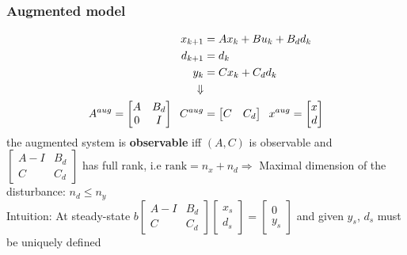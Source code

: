 \subsubsection{Augmented model}
\begin{align*}
    x_{k+1} &= Ax_k + B u_k + B_d d_k\\
    d_{k+1} &= d_k\\
    y_k &= Cx_k + C_dd_k\\ 
    \Downarrow \\
    A^{aug} = \begin{bmatrix} A & B_d \\ 0 & I\end{bmatrix} \hspace{2mm} C^{aug} &= \begin{bmatrix}
        C & C_d
    \end{bmatrix}
    \hspace{2mm} x^{aug} = \begin{bmatrix} x \\ d\end{bmatrix}
\end{align*}
the augmented system is \textbf{observable} iff $(A,C)$ is observable and $\begin{bmatrix} A-I & B_d \\ C & C_d \end{bmatrix}$ has full rank, i.e $\mathrm{rank} = n_x+n_d \Rightarrow$ Maximal dimension of the disturbance: $ n_d \leq  n_y$\\
Intuition: At steady-state $b\begin{bmatrix} A-I & B_d \\ C & C_d \end{bmatrix} \begin{bmatrix}x_s \\ d_s\end{bmatrix} = \begin{bmatrix}0 \\ y_s \end{bmatrix}$ and given $y_s$, $d_s$ must be uniquely defined
\vfill\null\columnbreak
